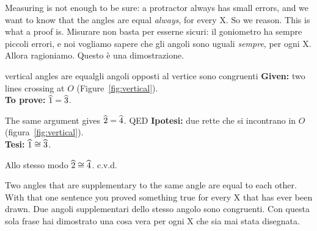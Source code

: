 \begin{bi}
Measuring is not enough to be sure: a protractor always has small errors, and we want to know that the angles are equal \emph{always}, for every X. So we reason. This is what a proof is.
\IT
Misurare non basta per esserne sicuri: il goniometro ha sempre piccoli errori, e noi vogliamo sapere che gli angoli sono uguali \emph{sempre}, per ogni X. Allora ragioniamo. Questo è una dimostrazione.
\end{bi}

\begin{proofbox}{vertical angles are equal}{gli angoli opposti al vertice sono congruenti}
\textbf{Given:} two lines crossing at $O$ (Figure~\ref{fig:vertical}).\\
\textbf{To prove:} $\widehat{1} = \widehat{3}$.
\begin{steps}
\end{steps}
The same argument gives $\widehat{2} = \widehat{4}$. \hfill QED
\tcblower
\textbf{Ipotesi:} due rette che si incontrano in $O$ (figura~\ref{fig:vertical}).\\
\textbf{Tesi:} $\widehat{1} \cong \widehat{3}$.
\begin{steps}
\end{steps}
Allo stesso modo $\widehat{2} \cong \widehat{4}$. \hfill c.v.d.
\end{proofbox}

\begin{keyidea}{}{}
Two angles that are supplementary to the same angle are equal to each other. With that one sentence you proved something true for every X that has ever been drawn.
\tcblower
Due angoli supplementari dello stesso angolo sono congruenti. Con questa sola frase hai dimostrato una cosa vera per ogni X che sia mai stata disegnata.
\end{keyidea}

